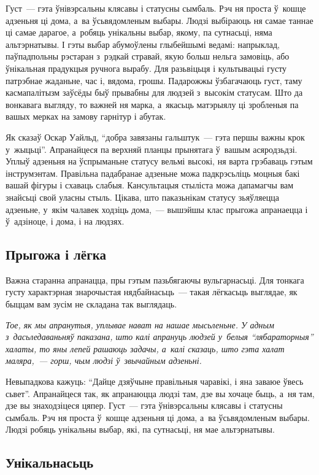 Густ~--- гэта ўнівэрсальны клясавы і статусны сымбаль. Рэч ня проста ў~кошце адзеньня ці дома, а~ва ўсьвядомленым выбары. Людзі выбіраюць ня самае таннае ці самае дарагое, а~робяць унікальны выбар, якому, па сутнасьці, няма альтэрнатывы. І гэты выбар абумоўлены глыбейшымі ведамі: напрыклад, паўпадпольны рэстаран з~рэдкай стравай, якую больш нельга замовіць, або ўнікальная прадукцыя ручнога вырабу. Для разьвіцьця і культывацыі густу патрэбнае жаданьне, час і, вядома, грошы. Падарожжы ўзбагачаюць густ, таму касмапалітызм заўсёды быў прывабны для людзей з~высокім статусам. Што да вонкавага выгляду, то важней ня марка, а~якасьць матэрыялу ці зробленыя па вашых мерках на замову гарнітур і абутак.

Як сказаў Оскар Уайльд, ``добра завязаны гальштук~--- гэта першы важны крок у~жыцьці''. Апранайцеся па верхняй планцы прынятага ў~вашым асяродзьдзі. Уплыў адзеньня на ўспрыманьне статусу вельмі высокі, ня варта грэбаваць гэтым інструмэнтам. Правільна падабранае адзеньне можа падкрэсьліць моцныя бакі вашай фігуры і схаваць слабыя. Кансультацыя стыліста можа дапамагчы вам знайсьці свой уласны стыль. Цікава, што паказьнікам статусу зьяўляецца адзеньне, у~якім чалавек ходзіць дома,~--- вышэйшы клас прыгожа апранаецца і ў~адзіноце, і дома, і на людзях.

\subsection*{Прыгожа і лёгка}

Важна старанна апранацца, пры гэтым пазьбягаючы вульгарнасьці. Для тонкага густу характэрная знарочыстая нядбайнасьць~--- такая лёгкасьць выглядае, як быццам вам зусім не складана так выглядаць.

\emph{Тое, як мы апранутыя, уплывае нават на нашае мысьленьне. У адным з~дасьледаваньняў паказана, што калі апрануць людзей у~белыя ``лябараторныя'' халаты, то яны лепей рашаюць задачы, а~калі сказаць, што гэта халат маляра,~--- горш, чым людзі ў~звычайным адзеньні.}

Невыпадкова кажуць: ``Дайце дзяўчыне правільныя чаравікі, і яна заваюе ўвесь сьвет''. Апранайцеся так, як апранаюцца людзі там, дзе вы хочаце быць, а~ня там, дзе вы знаходзіцеся цяпер. Густ~--- гэта ўнівэрсальны клясавы і статусны сымбаль. Рэч ня проста ў~кошце адзеньня ці дома, а~ва ўсьвядомленым выбары. Людзі робяць унікальны выбар, які, па сутнасьці, ня мае альтэрнатывы.

\subsection*{Унікальнасьць}

